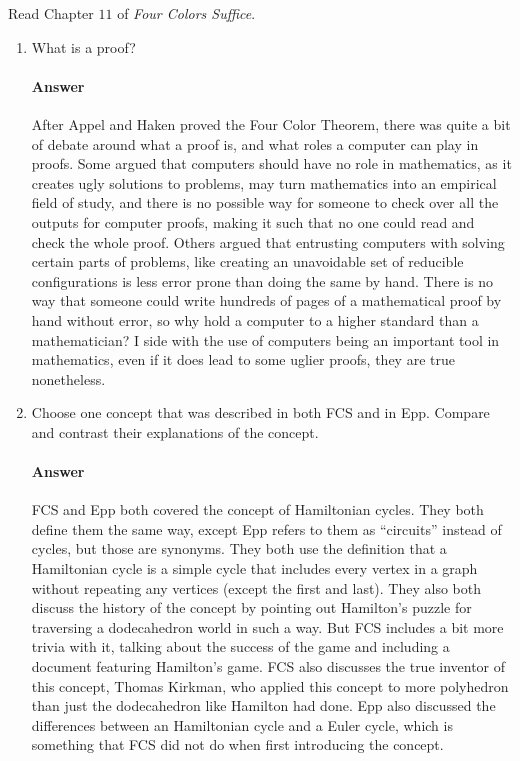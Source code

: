 \documentclass{article}
\begin{document}
Read Chapter $11$ of \emph{Four Colors Suffice}.

\begin{enumerate}

    \item What is a proof?

        \paragraph{Answer}

       After Appel and Haken proved the Four Color Theorem, there was quite a bit of debate around what a proof is,
       and what roles a computer can play in proofs. Some argued that computers should have no role in mathematics,
       as it creates ugly solutions to problems, may turn mathematics into an empirical field of study, and there is no possible
       way for someone to check over all the outputs for computer proofs, making it such that no one could read and check the whole 
       proof. Others argued that entrusting computers with solving certain parts of problems, like creating an unavoidable set of reducible configurations
       is less error prone than doing the same by hand. There is no way that someone could write hundreds of pages of a mathematical proof by hand 
       without error, so why hold a computer to a higher standard than a mathematician? I side with the use of computers being an important tool in mathematics,
       even if it does lead to some uglier proofs, they are true nonetheless. 


    \item Choose one concept that was described in both FCS and in Epp.
        Compare and contrast their explanations of the concept.

        \paragraph{Answer}

        FCS and Epp both covered the concept of Hamiltonian cycles. They both define them the same way, except Epp refers to them as ``circuits'' instead of cycles, but those are synonyms. They both use the definition that a Hamiltonian cycle is a simple cycle that includes every vertex in a graph without repeating any vertices (except the first and last). They also both discuss the history of the concept by pointing out Hamilton's puzzle for traversing a dodecahedron world in such a way. But FCS includes a bit more trivia with it, talking about the success of the game and including a document featuring Hamilton's game. FCS also discusses the true inventor of this concept, Thomas Kirkman, who applied this concept to more polyhedron than just the dodecahedron like Hamilton had done. Epp also discussed the differences between an Hamiltonian cycle and a Euler cycle, which is something that FCS did not do when first introducing the concept.

\end{enumerate}
\end{document}
